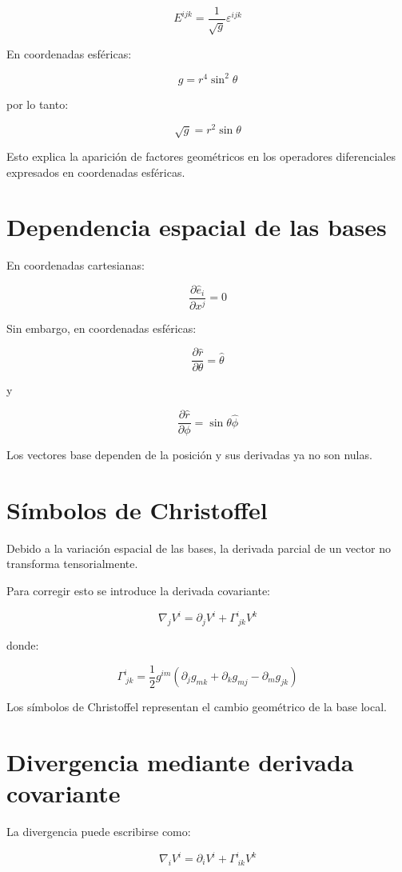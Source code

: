 \documentclass[12pt]{article}
\begin{document}
\[
E^{ijk}
=
\frac{1}{\sqrt{g}}
\varepsilon^{ijk}
\]

En coordenadas esféricas:

\[
g=r^4\sin^2\theta
\]

por lo tanto:

\[
\sqrt{g}=r^2\sin\theta
\]

Esto explica la aparición de factores geométricos en los operadores diferenciales expresados en coordenadas esféricas.

\section{Dependencia espacial de las bases}

En coordenadas cartesianas:

\[
\frac{\partial \hat{e}_i}{\partial x^j}=0
\]

Sin embargo, en coordenadas esféricas:

\[
\frac{\partial \hat{r}}{\partial\theta}
=
\hat{\theta}
\]

y

\[
\frac{\partial \hat{r}}{\partial\phi}
=
\sin\theta\hat{\phi}
\]

Los vectores base dependen de la posición y sus derivadas ya no son nulas.

\section{Símbolos de Christoffel}

Debido a la variación espacial de las bases, la derivada parcial de un vector no transforma tensorialmente.

Para corregir esto se introduce la derivada covariante:

\[
\nabla_jV^i
=
\partial_jV^i
+
\Gamma^i_{\ jk}V^k
\]

donde:

\[
\Gamma^i_{\ jk}
=
\frac{1}{2}
g^{im}
\left(
\partial_jg_{mk}
+
\partial_kg_{mj}
-
\partial_mg_{jk}
\right)
\]

Los símbolos de Christoffel representan el cambio geométrico de la base local.

\section{Divergencia mediante derivada covariante}

La divergencia puede escribirse como:

\[
\nabla_iV^i
=
\partial_iV^i
+
\Gamma^i_{\ ik}V^k
\]
\end{document}
